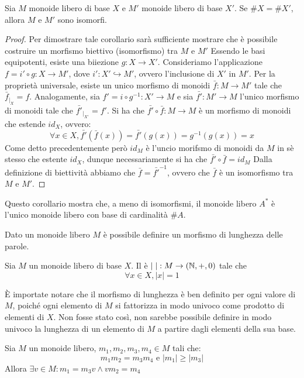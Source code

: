 \begin{corollary}
  Sia \(M\) monoide libero di base \(X\) e \(M'\) monoide libero di base \(X'\).
  Se \(\#X = \#X'\), allora \(M\) e \(M'\) sono isomorfi.
\end{corollary}

\begin{proof}
  Per dimostrare tale corollario sarà sufficiente mostrare che è possibile costruire un morfismo biettivo (isomorfismo) tra \(M\) e \(M'\)
  Essendo le basi equipotenti, esiste una biiezione \(g: X \to X'\).
  Consideriamo l'applicazione \(f = i' \circ g : X \to M'\), dove \(i': X' \hookrightarrow M'\), ovvero l'inclusione di \(X'\) in \(M'\).
  Per la proprietà universale, esiste un unico morfismo di monoidi \(\bar{f}: M \to M'\) tale che \(\bar{f}_{|_X} = f\).
  Analogamente, sia \(f'= i \circ g^{-1} : X' \to M\) e sia \(\bar{f'}: M' \to M\) l'unico morfismo di monoidi tale che \(\bar{f'}_{|_{X'}} = f'\).
  Si ha che \(\bar{f'} \circ \bar{f}: M \to M\) è un morfismo di monoidi che estende \(id_X\), ovvero:
  \[\forall x \in X, \bar{f'} (\bar{f}(x)) = \bar{f'}(g(x))= g^{-1}(g(x))= x\]
  Come detto precedentemente però \(id_M\) è l'uncio morifsmo di monoidi da \(M\) in sè stesso che estente \(id_X\), dunque necessariamente si ha che \(\bar{f'} \circ \bar{f} = id_M\)
  Dalla definizione di biettività abbiamo che \(\bar{f} = \bar{f'}^{-1} \), ovvero che \(\bar{f}\) è un isomorfismo tra \(M\) e \(M'\). 
\end{proof}
Questo corollario mostra che, a meno di isomorfismi, il monoide libero \(A^*\) è l'unico monoide libero con base di cardinalità \(\#A\).

Dato un monoide libero \(M\) è possibile definire un morfismo di lunghezza delle parole.
\begin{definition}
  Sia \(M\) un monoide libero di base \(X\).
  Il  è \(|\;|: M \to(\mathbb{N},+,0)\) tale che \[\forall x \in X, |x| = 1\]
\end{definition}

\begin{note}
  È importate notare che il morfismo di lunghezza è ben definito per ogni valore di \(M\), poiché ogni elemento di \(M\) si fattorizza in modo univoco come prodotto di elementi di \(X\).
  Non fosse stato così, non sarebbe possibile definire in modo univoco la lunghezza di un elemento di \(M\) a partire dagli elementi della sua base.
\end{note}

\begin{lemma}[Levi]
  Sia \(M\) un monoide libero, \(m_1,m_2,m_3,m_4 \in M\) tali che:
  \[m_1m_2=m_3m_4 \text{ e } |m_1| \geq |m_3|\]
  Allora \(\exists v \in M: m_1 = m_3v \land vm_2 = m_4\)
\end{lemma}

